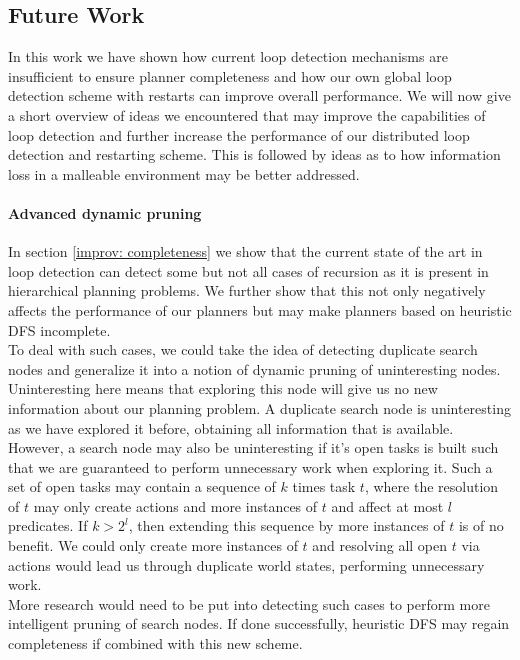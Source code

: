 \subsection{Future Work}
\label{future work}
In this work we have shown how current loop detection mechanisms are insufficient to ensure planner completeness and how our own global loop detection scheme with restarts can improve overall performance. We will now give a short overview of ideas we encountered that may improve the capabilities of loop detection and further increase the performance of our distributed loop detection and restarting scheme. This is followed by ideas as to how information loss in a malleable environment may be better addressed.

\paragraph{Advanced dynamic pruning}
In section \ref{improv: completeness} we show that the current state of the art in loop detection can detect some but not all cases of recursion as it is present in hierarchical planning problems. We further show that this not only negatively affects the performance of our planners but may make planners based on heuristic DFS incomplete. \\
To deal with such cases, we could take the idea of detecting duplicate search nodes and generalize it into a notion of dynamic pruning of uninteresting nodes. Uninteresting here means that exploring this node will give us no new information about our planning problem. A duplicate search node is uninteresting as we have explored it before, obtaining all information that is available. However, a search node may also be uninteresting if it's open tasks is built such that we are guaranteed to perform unnecessary work when exploring it. Such a set of open tasks may contain a sequence of $k$ times task $t$, where the resolution of $t$ may only create actions and more instances of $t$ and affect at most $l$ predicates. If $k > 2^l$, then extending this sequence by more instances of $t$ is of no benefit. We could only create more instances of $t$ and resolving all open $t$ via actions would lead us through duplicate world states, performing unnecessary work. \\
More research would need to be put into detecting such cases to perform more intelligent pruning of search nodes. If done successfully, heuristic DFS may regain completeness if combined with this new scheme.
